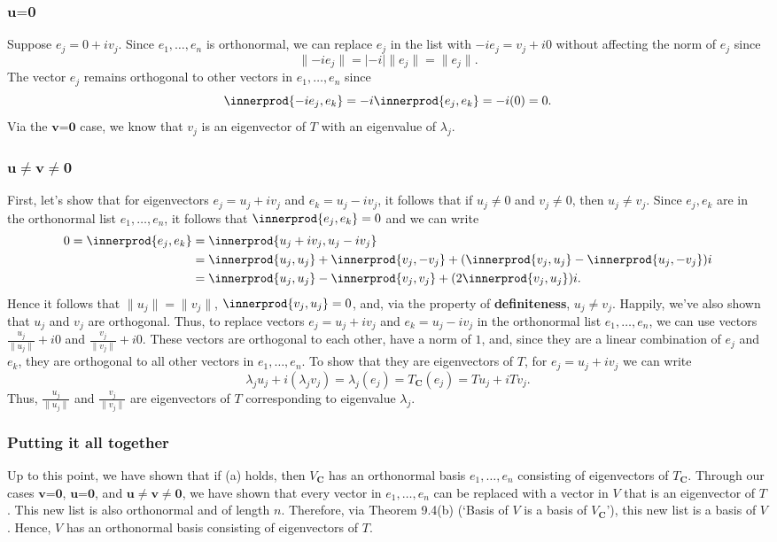 \documentclass{article}
\providecommand{\abs}[1]{\lvert#1\rvert} \providecommand{\norm}[1]{\lVert#1\rVert}
\DeclarePairedDelimiter{\innerprod}\langle\rangle
\begin{document}
\subsubsection*{$\textbf{u=0}$}
Suppose $e_j=0+iv_j$. Since $e_1,\ldots,e_n$ is orthonormal, we can replace $e_j$ in the list with $-ie_j=v_j+i0$ without affecting the norm of $e_j$ since 
\[\norm{-ie_j}=\abs{-i}\norm{e_j}=\norm{e_j}.\]
The vector $e_j$ remains orthogonal to other vectors in $e_1,\ldots,e_n$ since
\[\innerprod{-ie_j,e_k}=-i\innerprod{e_j,e_k}=-i(0)=0.\]
Via the $\textbf{v=0}$ case, we know that $v_j$ is an eigenvector of $T$ with an eigenvalue of $\lambda_j$.

\subsubsection*{$\textbf{u}\neq\textbf{v}\neq\textbf{0}$}
First, let's show that for eigenvectors $e_j=u_j+iv_j$ and\newline 
$e_k=u_j-iv_j$, it follows that if $u_j\neq 0$ and $v_j\neq0$, then $u_j\neq v_j$. 
Since $e_j,e_k$ are in the orthonormal list $e_1,\ldots,e_n$, it follows that $\innerprod{e_j,e_k}=0$ and we can write
\begin{align*}
    0=\innerprod{e_j,e_k}&=\innerprod{u_j+iv_j,u_j-iv_j}\\
    &=\innerprod{u_j,u_j} +\innerprod{v_j,-v_j} + (\innerprod{v_j,u_j} - \innerprod{u_j,-v_j})i\\
    &=\innerprod{u_j,u_j} -\innerprod{v_j,v_j} + (2\innerprod{v_j,u_j})i.
\end{align*}
Hence it follows that $\norm{u_j}=\norm{v_j}$, $\innerprod{v_j,u_j}=0$, and, via the property of \textbf{definiteness}, $u_j\neq v_j$. 
Happily, we've also shown that $u_j$ and $v_j$ are orthogonal. 
Thus, to replace vectors $e_j=u_j+iv_j$ and $e_k=u_j-iv_j$ in the orthonormal list $e_1,\ldots,e_n$, we can use vectors $\frac{u_j}{\norm{u_j}}+i0$ and $\frac{v_j}{\norm{v_j}}+i0$. 
These vectors are orthogonal to each other, have a norm of $1$, and, since they are a linear combination of $e_j$ and $e_k$, they are orthogonal to all other vectors in $e_1,\ldots,e_n$. To show that they are eigenvectors of $T$, for $e_j=u_j+iv_j$ we can write
\[\lambda_ju_j+i(\lambda_jv_j)=\lambda_j(e_j)=T_{\mathbf{C}}(e_j)=Tu_j+iTv_j.\]
Thus, $\frac{u_j}{\norm{u_j}}$ and $\frac{v_j}{\norm{v_j}}$ are eigenvectors of $T$ corresponding to eigenvalue $\lambda_j$.

\subsubsection*{Putting it all together}
Up to this point, we have shown that if (a) holds, then $V_{\textbf{C}}$ has an orthonormal basis $e_1,\ldots,e_n$ consisting of eigenvectors of $T_{\textbf{C}}$. 
Through our cases $\textbf{v=0}$, $\textbf{u=0}$, and $\textbf{u}\neq\textbf{v}\neq\textbf{0}$, we have shown that every vector in $e_1,\ldots,e_n$ can be replaced with a vector in $V$ that is an eigenvector of $T$. 
This new list is also orthonormal and of length $n$. 
Therefore, via Theorem 9.4(b) (`Basis of $V$ is a basis of $V_{\textbf{C}}$'), this new list is a basis of $V$. Hence, $V$ has an orthonormal basis consisting of eigenvectors of $T$. 
\end{document}
